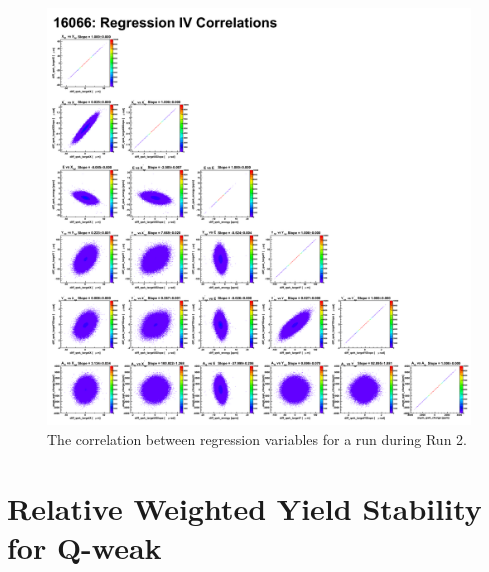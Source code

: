 \begin{singlespace}
\begin{figure}[!h]
	\begin{center}
	\includegraphics[width=15.0cm]{figures/regIV_correlationRun2}
	\end{center}
	\caption
	{The correlation between regression variables for a run during Run 2.}
	\label{fig:regIV_correlationRun2}
\end{figure}
\end{singlespace}





\section{Relative Weighted Yield Stability for Q-weak}
\label{Relative Weighted Yield Stability for Q-weak}

